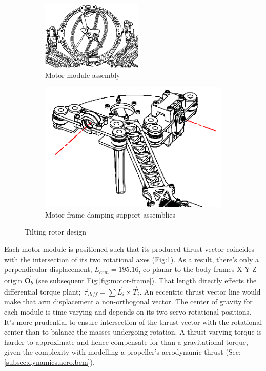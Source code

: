 \begin{figure}[hbtp]
\begin{subfigure}{.49\textwidth}
\centering
\includegraphics[width=\textwidth]{figs/motor-assembly}
\caption{Motor module assembly}
\label{fig:motor-assembly}
\end{subfigure}
\begin{subfigure}{.49\textwidth}
\centering
\includegraphics[width=\textwidth]{figs/motor-support}
\caption{Motor frame damping support assemblies}
\label{fig:motor_support}
\end{subfigure}
\caption{Tilting rotor design}
\end{figure}
Each motor module is positioned such that its produced thrust vector coincides with the intersection of its two rotational axes (Fig:\ref{fig:motor-assembly}). As a result, there's only a perpendicular displacement, $L_{arm}=195.16$, co-planar to the body frames X-Y-Z origin $\vec{\mathbf{O}}_b$ (see subsequent Fig:\ref{fig:motor-frame}). That length directly effects the differential torque plant; $\vec{\tau}_{diff}=\sum\vec{L}_i\times\vec{T}_i$. An eccentric thrust vector line would make that arm displacement a non-orthogonal vector. The center of gravity for each module is time varying and depends on its two servo rotational positions. It's more prudential to ensure intersection of the thrust vector with the rotational center than to balance the masses undergoing rotation. A thrust varying torque is harder to approximate and hence compensate for than a gravitational torque, given the complexity with modelling a propeller's aerodynamic thrust (Sec:\ref{subsec:dynamics.aero.bem}).
